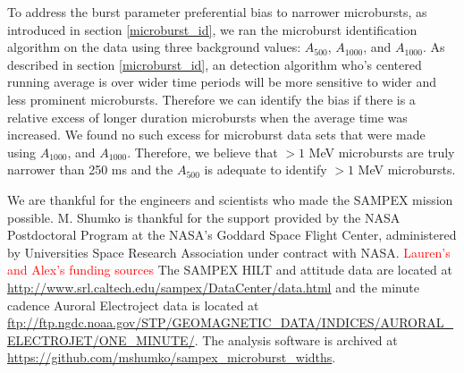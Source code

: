 \documentclass[draft]{agujournal2019}
\begin{document}
To address the burst parameter preferential bias to narrower microbursts, as introduced in section \ref{microburst_id}, we ran the microburst identification algorithm on the data using three background values: $A_{500}$, $A_{1000}$, and $A_{1000}$. As described in section \ref{microburst_id}, an detection algorithm who's centered running average is over wider time periods will be more sensitive to wider and less prominent microbursts. Therefore we can identify the bias if there is a relative excess of longer duration microbursts when the average time was increased. We found no such excess for microburst data sets that were made using $A_{1000}$, and $A_{1000}$. Therefore, we believe that $>1$ MeV microbursts are truly narrower than 250 ms and the $A_{500}$ is adequate to identify $>1$ MeV microbursts.

%
%
%
%

\acknowledgments
We are thankful for the engineers and scientists who made the SAMPEX mission possible. M. Shumko is thankful for the support provided by the NASA Postdoctoral Program at the NASA’s Goddard Space Flight Center, administered by Universities Space Research Association under contract with NASA. \textcolor{red}{Lauren's and Alex's funding sources} The SAMPEX HILT and attitude data are located at \url{http://www.srl.caltech.edu/sampex/DataCenter/data.html} and the minute cadence Auroral Electroject data is located at \url{ftp://ftp.ngdc.noaa.gov/STP/GEOMAGNETIC_DATA/INDICES/AURORAL_ELECTROJET/ONE_MINUTE/}.
The analysis software is archived at \textcolor{red}{\url{https://github.com/mshumko/sampex_microburst_widths}}.



%
%
\end{document}
